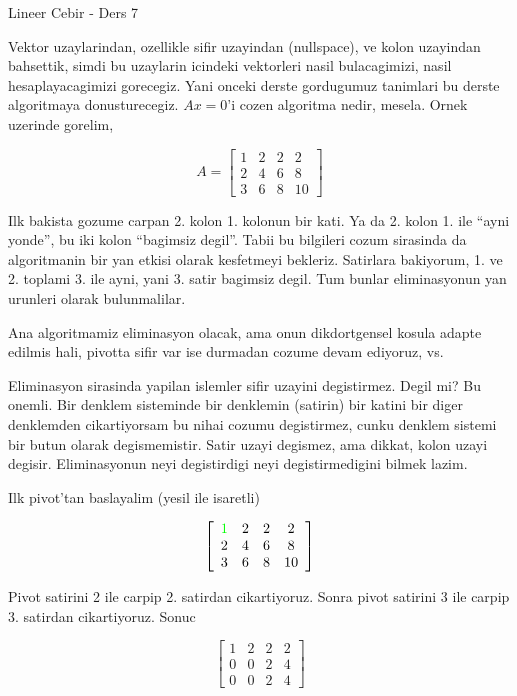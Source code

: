 \documentclass[12pt,fleqn]{article}\usepackage{../common}
\begin{document}
Lineer Cebir - Ders 7

Vektor uzaylarindan, ozellikle sifir uzayindan (nullspace), ve kolon
uzayindan bahsettik, simdi bu uzaylarin icindeki vektorleri nasil
bulacagimizi, nasil hesaplayacagimizi gorecegiz. Yani onceki derste
gordugumuz tanimlari bu derste algoritmaya donusturecegiz. $Ax=0$'i cozen
algoritma nedir, mesela. Ornek uzerinde gorelim,

$$ 
A = 
\left[\begin{array}{cccc}
1 & 2 & 2 & 2  \\
2 & 4 & 6 & 8 \\
3 & 6 & 8 & 10
\end{array}\right]
 $$

Ilk bakista gozume carpan 2. kolon 1. kolonun bir kati. Ya da 2. kolon
1. ile ``ayni yonde'', bu iki kolon ``bagimsiz degil''. Tabii bu bilgileri
cozum sirasinda da algoritmanin bir yan etkisi olarak kesfetmeyi
bekleriz. Satirlara bakiyorum, 1. ve 2. toplami 3. ile ayni, yani 3. satir
bagimsiz degil. Tum bunlar eliminasyonun yan urunleri olarak bulunmalilar.

Ana algoritmamiz eliminasyon olacak, ama onun dikdortgensel kosula adapte
edilmis hali, pivotta sifir var ise durmadan cozume devam ediyoruz, vs.

Eliminasyon sirasinda yapilan islemler sifir uzayini degistirmez. Degil mi?
Bu onemli. Bir denklem sisteminde bir denklemin (satirin) bir katini bir
diger denklemden cikartiyorsam bu nihai cozumu degistirmez, cunku denklem
sistemi bir butun olarak degismemistir. Satir uzayi degismez, ama dikkat,
kolon uzayi degisir. Eliminasyonun neyi degistirdigi neyi degistirmedigini
bilmek lazim. 

Ilk pivot'tan baslayalim (yesil ile isaretli)

$$ 
\left[\begin{array}{cccc}
\textcolor{green}{1} & 2 & 2 & 2  \\
2 & 4 & 6 & 8 \\
3 & 6 & 8 & 10
\end{array}\right]
 $$

Pivot satirini 2 ile carpip 2. satirdan cikartiyoruz. Sonra pivot satirini
3 ile carpip 3. satirdan cikartiyoruz. Sonuc

$$ 
\left[\begin{array}{cccc}
1 & 2 & 2 & 2  \\
0 & 0 & 2 & 4 \\
0 & 0 & 2 & 4
\end{array}\right]
 $$
\end{document}
